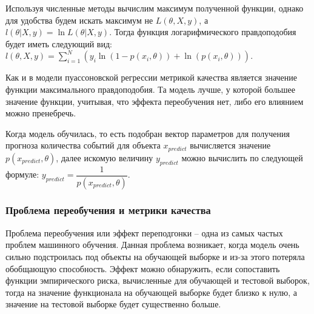 Используя численные методы вычислим максимум полученной функции, однако для удобства будем искать максимум не $L(\theta, X, y)$, а $l(\theta | X,y) = \ln L(\theta | X,y)$. Тогда функция логарифмического правдоподобия будет иметь следующий вид: $l(\theta, X, y) = \sum\limits_{i = 1}^N ( y_i \ln(1 - p(x_i,\theta)) + \ln(p(x_i,\theta)) )$.

Как и в модели пуассоновской регрессии метрикой качества является значение функции максимального правдоподобия. Та модель лучше, у которой большее значение функции, учитывая, что эффекта переобучения нет, либо его влиянием можно пренебречь.

Когда модель обучилась, то есть подобран вектор параметров для получения прогноза количества событий для объекта $x_{predict}$ вычисляется значение $p(x_{predict}, \theta)$, далее искомую величину $y_{predict}$ можно вычислить по следующей формуле: $y_{predict} = \dfrac{1}{p(x_{predict}, \theta)}$.

\subsubsection{Проблема переобучения и метрики качества}

Проблема переобучения или эффект переподгонки -- одна из самых частых проблем машинного обучения. Данная проблема возникает, когда модель очень сильно подстроилась под объекты на обучающей выборке и из-за этого потеряла обобщающую способность. Эффект можно обнаружить, если сопоставить функции эмпирического риска, вычисленные для обучающей и тестовой выборок, тогда на значение функционала на обучающей выборке будет близко к нулю, а значение на тестовой выборке будет существенно больше.

